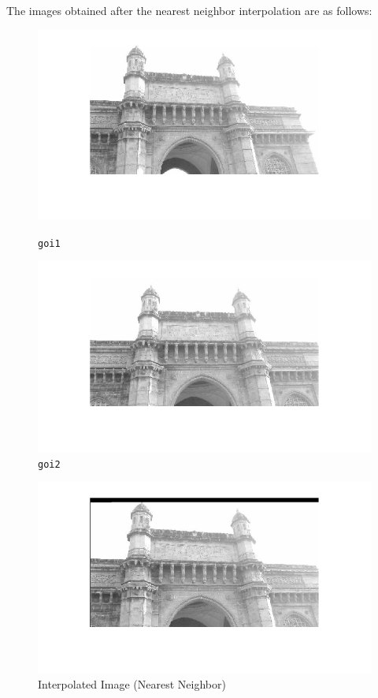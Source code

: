 \documentclass{article}
\begin{document}
The images obtained after the nearest neighbor interpolation are as follows:
\begin{figure}[htbp]
    \centering
    \begin{minipage}[b]{0.45\textwidth}
        \includegraphics[width=\textwidth]{nn_im1.png}
        \caption{\texttt{goi1}}
    \end{minipage}
    \begin{minipage}[b]{0.45\textwidth}
        \includegraphics[width=\textwidth]{nn_im2.png}
        \caption{\texttt{goi2}}
    \end{minipage}
\end{figure}
\begin{figure}[!htb]
    \includegraphics[width=\textwidth]{nn_im3.png}
    \caption{Interpolated Image (Nearest Neighbor)}
\end{figure}
\end{document}
